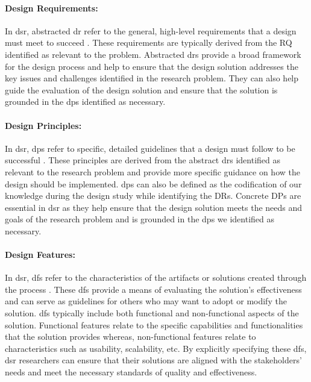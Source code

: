 \paragraph{Design Requirements:}
In \ac{dsr}, abstracted \ac{dr} refer to the general, high-level requirements that a design must meet to succeed \cite{misc:dsr:webster}. 
These requirements are typically derived from the RQ identified as relevant to the problem.
Abstracted \ac{dr}s provide a broad framework for the design process and help to ensure that the design solution addresses the key issues and challenges identified in the research problem. 
They can also help guide the evaluation of the design solution and ensure that the solution is grounded in the \ac{dp}s identified as necessary.

\paragraph{Design Principles:}
In \ac{dsr}, \ac{dp}s refer to specific, detailed guidelines that a design must follow to be successful \cite{misc:dsr:webster}. 
These principles are derived from the abstract \ac{dr}s identified as relevant to the research problem and provide more specific guidance on how the design should be implemented.
\ac{dp}s can also be defined as the codification of our knowledge during the design study while identifying the DRs. 
Concrete DPs are essential in \ac{dsr} as they help ensure that the design solution meets the needs and goals of the research problem and is grounded in the \ac{dp}s we identified as necessary.

\paragraph{Design Features:}
In \ac{dsr}, \ac{df}s refer to the characteristics of the artifacts or solutions created through the process \cite{misc:dsr:webster}. 
These \ac{df}s provide a means of evaluating the solution's effectiveness and can serve as guidelines for others who may want to adopt or modify the solution.
\ac{df}s typically include both functional and non-functional aspects of the solution. 
Functional features relate to the specific capabilities and functionalities that the solution provides whereas, non-functional features relate to characteristics such as usability, scalability, etc. 
By explicitly specifying these \ac{df}s, \ac{dsr} researchers can ensure that their solutions are aligned with the stakeholders' needs and meet the necessary standards of quality and effectiveness.

